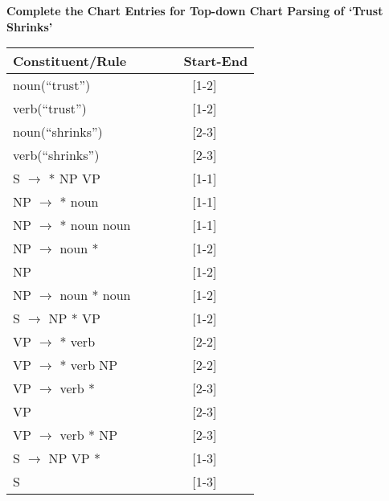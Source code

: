 \documentclass[11pt]{article}
\begin{document}
\begin{enumerate}
\begin{center}
{\bf Complete the Chart Entries for Top-down Chart Parsing of `Trust Shrinks'} 
\end{center}

\begin{center}
\begin{tabular}{lc} 
{\bf Constituent/Rule~~~} & {\bf ~~~Start-End} \\ \hline
noun(``trust'') &  [1-2] \\
verb(``trust'') & [1-2] \\
noun(``shrinks'') & [2-3] \\
verb(``shrinks'') & [2-3] \\
S $\rightarrow$ * NP VP & [1-1] \\
NP $\rightarrow$ * noun & [1-1] \\ 
NP $\rightarrow$ * noun noun & [1-1] \\ 
NP $\rightarrow$  noun * & [1-2] \\ 
NP & [1-2]\\
NP $\rightarrow$  noun * noun & [1-2] \\ 
S $\rightarrow$  NP * VP & [1-2] \\
VP $\rightarrow$ * verb  &[2-2]\\
VP $\rightarrow$ * verb  NP & [2-2]\\
VP $\rightarrow$  verb * &[2-3]\\
VP & [2-3]\\
VP $\rightarrow$  verb *  NP &[2-3]\\
S $\rightarrow$  NP  VP * & [1-3] \\
S & [1-3]\\\hline

\end{tabular}
\end{center}



\end{enumerate}  %
\end{document}
